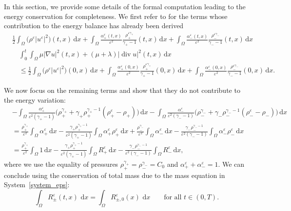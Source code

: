 \documentclass[11pt, twoside, a4paper]{article}
\theoremstyle{plain}
\theoremstyle{remark}
\numberwithin{equation}{section}
\newcommand{\dd}{\,\mathrm{d}}
\renewcommand{\div}{\operatorname{div}}
\renewcommand{\leq}{\leqslant}\renewcommand{\le}{\leqslant}
\renewcommand{\epsilon}{\varepsilon}
\newcommand{\eps}{\varepsilon}
\newcommand{\ap}{\alpha_+}
\newcommand{\am}{\alpha_-}
\newcommand{\rp}{\rho_+}
\newcommand{\rmi}{\rho_-}
\newcommand{\gp}{\gamma_{+}}
\newcommand{\gm}{\gamma_-}
\begin{document}
In this section, we provide some details of the formal computation leading to the energy conservation for completeness. We first refer to \cite{lebot2025low} for the terms whose contribution to the energy balance has already been derived
\begin{equation*}
 \begin{aligned}
 &\frac{1}{2} \int_{\Omega} \Big(\rho^\varepsilon |u^\eps|^2\Big)(t,x) \dd x + \int_{\Omega} \frac{\alpha_+^{\epsilon}(t,x)}{\epsilon^2} \frac{\rho_+^{\eps \gp}}{\gp-1}(t,x)\dd x + \int_{\Omega} \frac{\alpha_-^{\epsilon}(t,x)}{\epsilon^2} \frac{\rho_-^{\eps \gm}}{\gm-1}(t,x)\dd x \\
 &\quad \int_0^t \int_\Omega \mu | \nabla u |^2(t,x) + (\mu+\lambda) |\div u |^2 (t,x)\dd x\\
 &\quad \leq \frac{1}{2} \int_{\Omega} \Big(\rho^\varepsilon |u^\eps|^2\Big)(0,x) \dd x + \int_{\Omega} \frac{\alpha_+^{\epsilon}(0,x)}{\epsilon^2} \frac{\rho_+^{\eps \gp}}{\gp-1}(0,x)\dd x + \int_{\Omega} \frac{\alpha_-^{\epsilon}(0,x)}{\epsilon^2} \frac{\rho_-^{\eps \gm}}{\gm-1}(0,x)\dd x.
 \end{aligned}
 \end{equation*}

We now focus on the remaining terms and show that they do not contribute to the energy variation:
\begin{align*}
 &-\int_{\Omega} \frac{\alpha_+^{\epsilon}}{\epsilon^2(\gp-1)} \Big(\rp^{\gp}+\gp \rp^{\gp-1}(\rp^\eps - \rp)\Big) \dd x - \int_{\Omega} \frac{\alpha_-^{\epsilon}}{\epsilon^2(\gm-1)}\Big(\rmi^{\gm}+\gm \rmi^{\gm-1}(\rmi^\eps-\rmi)\Big) \dd x\\
 &= \frac{\rp^{\gp}}{\epsilon^2} \int_{\Omega} \alpha_+^{\epsilon} \dd x - \frac{\gp \rp^{\gp-1}}{\eps^2(\gp-1)} \int_\Omega \ap^\eps \rp^\eps \dd x + \frac{\rmi^{\gm}}{\epsilon^2} \int_{\Omega} \alpha_-^{\epsilon} \dd x - \frac{\gm \rmi^{\gm-1}}{\eps^2(\gm-1)} \int_\Omega \am^\eps \rmi^\eps \dd x\\
 &=\frac{\rp^{\gp}}{\eps^2}\int_\Omega 1 \dd x - \frac{\gp \rp^{\gp-1}}{\eps^2(\gp-1)} \int_\Omega R_+^\eps \dd x - \frac{\gm \rmi^{\gm-1}}{\eps^2(\gm-1)} \int_\Omega R_-^\eps \dd x,
\end{align*}
where we use the equality of pressures $\rp^{\gp}=\rmi^{\gm}=C_0$ and $\ap^\eps+\am^\eps=1$. We can conclude using the conservation of total mass due to the mass equation in System~\eqref{system_eps}:
\begin{equation}\label{eq.consmass}
\int_\Omega R_\pm^\varepsilon(t,x) \, \dd x = \int_\Omega R_{\pm,0}^\varepsilon(x) \, \dd x \qquad \text{for all } t\in (0,T).
\end{equation}
\end{document}
